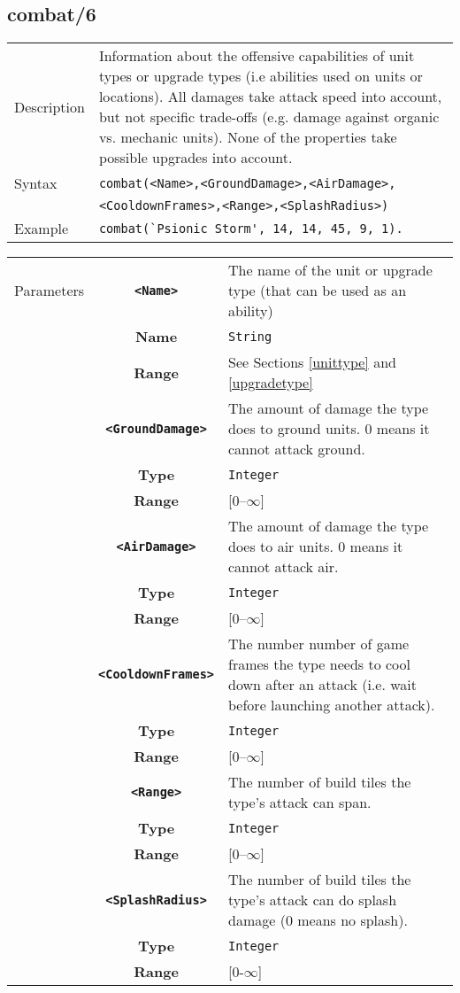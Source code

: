 \subsection{combat/6}
\begin{tabularx}{\textwidth}{lX}
 Description & Information about the offensive capabilities of unit types or upgrade types (i.e abilities used on units or locations). All damages take attack speed into account, but not specific trade-offs (e.g. damage against organic vs. mechanic units). None of the properties take possible upgrades into account. \\
 Syntax & \verb|combat(<Name>,<GroundDamage>,<AirDamage>,| \\ & \quad \verb|<CooldownFrames>,<Range>,<SplashRadius>)| \\
 Example & \verb|combat(`Psionic Storm', 14, 14, 45, 9, 1).| \\
 \end{tabularx}
 \begin{tabularx}{\textwidth}{l | c | p{8cm}|}
 \cline{2-3}
 Parameters & \textbf{\verb|<Name>|} & The name of the unit or upgrade type (that can be used as an ability)\\
            & \textbf{Name} & \verb|String| \\
            & \textbf{Range} & See Sections \ref{unittype} and \ref{upgradetype} \\
            \cline{2-3}
            & \textbf{\verb|<GroundDamage>|} & The amount of damage the type does to ground units. 0 means it cannot attack ground. \\
            & \textbf{Type} & \verb|Integer| \\
            & \textbf{Range} & [0--$\infty$] \\
            \cline{2-3}
            & \textbf{\verb|<AirDamage>|} & The amount of damage the type does to air units. 0 means it cannot attack air. \\
            & \textbf{Type} & \verb|Integer| \\
            & \textbf{Range} & [0--$\infty$] \\
            \cline{2-3}
            & \textbf{\verb|<CooldownFrames>|} & The number number of game frames the type needs to cool down after an attack (i.e. wait before launching another attack).\\
            & \textbf{Type} & \verb|Integer| \\
            & \textbf{Range} & [0--$\infty$] \\
            \cline{2-3}
            & \textbf{\verb|<Range>|} & The number of build tiles the type's attack can span. \\
            & \textbf{Type} & \verb|Integer| \\
            & \textbf{Range} & [0--$\infty$] \\
            \cline{2-3}
            & \textbf{\verb|<SplashRadius>|} & The number of build tiles the type's attack can do splash damage (0 means no splash).\\
            & \textbf{Type} & \verb|Integer| \\
            & \textbf{Range} & [0-$\infty$] \\
            \cline{2-3}
\end{tabularx}